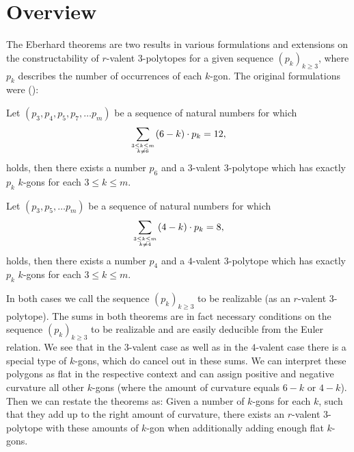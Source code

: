\section{Overview}

The {\sc Eberhard} theorems are two results in various formulations and extensions on the constructability of $r$-valent $3$-polytopes for a given sequence $(p_k)_{k \geq 3}$, where $p_k$ describes the number of occurrences of each $k$-gon. The original formulations were (\cite{ConvexPolytopes}):
\begin{theorem}\label{thm:eberhard:3} Let $(p_3, p_4, p_5, p_7, \dots p_m)$ be a sequence of natural numbers for which
\begin{align*}
  \sum_{3 \leq k \leq m \atop k \neq 6}(6 - k) \cdot p_k = 12,
\end{align*}
holds, then there exists a number $p_6$ and a $3$-valent $3$-polytope which has exactly $p_k$ $k$-gons for each $3 \leq k \leq m$.
\end{theorem}
\begin{theorem}\label{thm:eberhard:4} Let $(p_3,  p_5, \dots p_m)$ be a sequence of natural numbers for which
\begin{align*}
  \sum_{3 \leq k \leq m \atop k \neq 4}(4 - k) \cdot p_k = 8,
\end{align*}
holds, then there exists a number $p_4$ and a $4$-valent $3$-polytope which has exactly $p_k$ $k$-gons for each $3 \leq k \leq m$.
\end{theorem}
In both cases we call the sequence $(p_k)_{k \geq 3}$ to be realizable (as an $r$-valent $3$-polytope). The sums in both theorems are in fact necessary conditions on the sequence $(p_k)_{k \geq 3}$ to be realizable and are easily deducible from the {\sc Euler} relation. We see that in the $3$-valent case as well as in the $4$-valent case there is a special type of $k$-gons, which do cancel out in these sums. We can interpret these polygons as flat in the respective context and can assign positive and negative curvature all other $k$-gons (where the amount of curvature equals $6 - k$ or $4 - k$). Then we can restate the theorems as: Given a number of $k$-gons for each $k$, such that they add up to the right amount of curvature, there exists an $r$-valent $3$-polytope with these amounts of $k$-gon when additionally adding enough flat $k$-gons.\\

